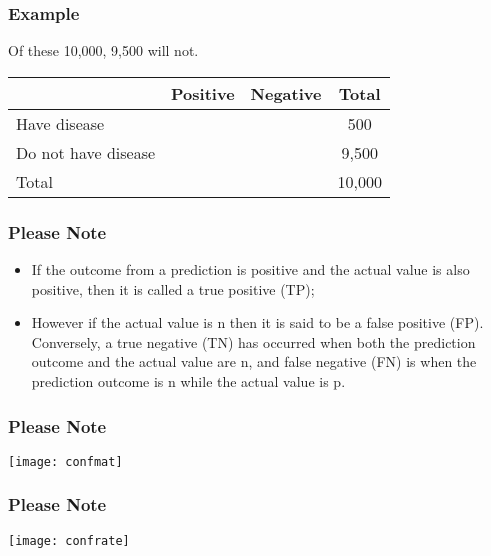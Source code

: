 \begin{frame}
\frametitle{Example}

\vspace{.1in}
Of these 10,000, 9,500 will not.\\ 
\begin{center}
\begin{tabular}{|l|c|c|c|}
\hline
& Positive & Negative &Total\\
\hline
Have disease & &&500\\
\hline
Do not have disease && &9,500\\
\hline
Total &&&10,000\\
\hline
\end{tabular}
\end{center}
\end{frame}

\begin{frame}
\frametitle{Please Note}
\begin{itemize}
\item  If the outcome from a prediction is positive and the actual value is also positive, then it is called a true positive (TP);
\item However if the actual value is n then it is said to be a false positive (FP). Conversely, a true negative (TN) has occurred when both the prediction outcome and the actual value are n, and false negative (FN) is when the prediction outcome is n while the actual value is p.
\end{itemize}
\end{frame}

\begin{frame}
\frametitle{Please Note}
\begin{center}
\texttt{[image: confmat]}
\end{center}
\end{frame}


\begin{frame}
\frametitle{Please Note}
\begin{center}
\texttt{[image: confrate]}
\end{center}
\end{frame}

